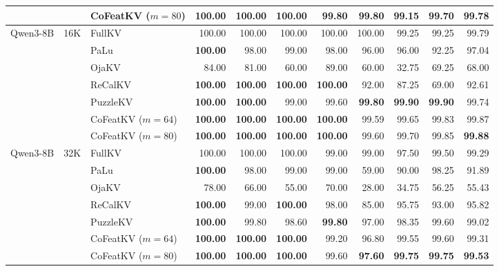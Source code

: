 \documentclass{article} %
\begin{document}
\begin{table}[H]
\begin{tabular}{@{}cclrrrrrrrr@{}}
 & & CoFeatKV ($m=80$) & \textbf{100.00} & \textbf{100.00} & \textbf{100.00} & \textbf{99.80} & 99.80 & 99.15 & 99.70 & \textbf{99.78} \\
\midrule
\multirow{7}{*}{Qwen3-8B} & \multirow{7}{*}{16K} & FullKV & 100.00 & 100.00 & 100.00 & 100.00 & 100.00 & 99.25 & 99.25 & 99.79 \\
\cmidrule(lr){3-11}
 & & PaLu~\citep{palu} & \textbf{100.00} & 98.00 & 99.00 & 98.00 & 96.00 & 96.00 & 92.25 & 97.04 \\
 & & OjaKV~\citep{ojakv} & 84.00 & 81.00 & 60.00 & 89.00 & 60.00 & 32.75 & 69.25 & 68.00 \\
 & & ReCalKV~\citep{recalkv} & \textbf{100.00} & \textbf{100.00} & \textbf{100.00} & \textbf{100.00} & 92.00 & 87.25 & 69.00 & 92.61 \\
 & & PuzzleKV~\citep{puzzlekv} & \textbf{100.00} & \textbf{100.00} & 99.00 & 99.60 & \textbf{99.80} & \textbf{99.90} & \textbf{99.90} & 99.74 \\
 & & CoFeatKV ($m=64$) & \textbf{100.00} & \textbf{100.00} & \textbf{100.00} & \textbf{100.00} & 99.59 & 99.65 & 99.83 & 99.87 \\
 & & CoFeatKV ($m=80$) & \textbf{100.00} & \textbf{100.00} & \textbf{100.00} & \textbf{100.00} & 99.60 & 99.70 & 99.85 & \textbf{99.88} \\
\midrule
\multirow{7}{*}{Qwen3-8B} & \multirow{7}{*}{32K} & FullKV & 100.00 & 100.00 & 100.00 & 99.00 & 99.00 & 97.50 & 99.50 & 99.29 \\
\cmidrule(lr){3-11}
 & & PaLu~\citep{palu} & \textbf{100.00} & 98.00 & 99.00 & 99.00 & 59.00 & 90.00 & 98.25 & 91.89 \\
 & & OjaKV~\citep{ojakv} & 78.00 & 66.00 & 55.00 & 70.00 & 28.00 & 34.75 & 56.25 & 55.43 \\
 & & ReCalKV~\citep{recalkv} & \textbf{100.00} & 99.00 & \textbf{100.00} & 98.00 & 85.00 & 95.75 & 93.00 & 95.82 \\
 & & PuzzleKV~\citep{puzzlekv} & \textbf{100.00} & 99.80 & 98.60 & \textbf{99.80} & 97.00 & 98.35 & 99.60 & 99.02 \\
 & & CoFeatKV ($m=64$) & \textbf{100.00} & \textbf{100.00} & \textbf{100.00} & 99.20 & 96.80 & 99.55 & 99.60 & 99.31 \\
 & & CoFeatKV ($m=80$) & \textbf{100.00} & \textbf{100.00} & \textbf{100.00} & 99.60 & \textbf{97.60} & \textbf{99.75} & \textbf{99.75} & \textbf{99.53} \\
\bottomrule
\end{tabular}
\end{table}
\end{document}
